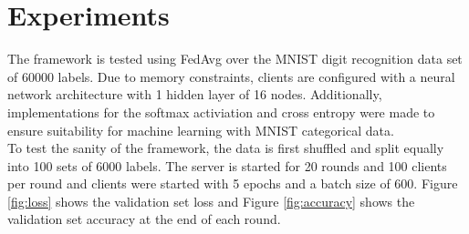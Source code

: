 \documentclass[12pt]{article}
\begin{document}
\section{Experiments}\label{experiments}
The framework is tested using FedAvg over the MNIST digit recognition data set of 60000 labels. Due to memory
constraints, clients are configured with a neural network architecture with 1 hidden layer of 16
nodes. Additionally, implementations for the softmax activiation and cross entropy were made to
ensure suitability for machine learning with MNIST categorical data.\\

To test the sanity of the framework, the data is first shuffled and split equally into 100 sets of 6000 labels.
The server is started for 20 rounds and 100 clients per round and clients were started with 5 epochs and a batch size of 600.
Figure \ref{fig:loss} shows the validation set loss and Figure \ref{fig:accuracy} shows the validation set accuracy at the end of each round.
\end{document}
